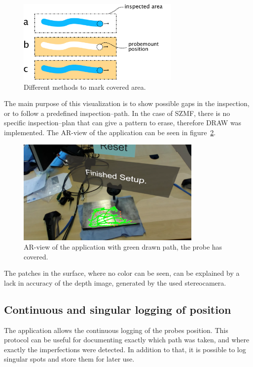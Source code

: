 \documentclass{VRARWorkshop}
\begin{document}
\begin{figure}[h!]
    \begin{center}
        \includegraphics[width=79mm]{images/DrawVsErase}
        \caption{\label{fig:DrawVsErase} Different methods to mark covered area.}
    \end{center}
\end{figure}

The main purpose of this visualization is to show possible gaps in the inspection, or to follow a predefined inspection--path.
In the case of SZMF, there is no specific inspection--plan that can give a pattern to erase, therefore DRAW was implemented.
The AR-view of the application can be seen in figure~\ref{fig:ARView}.

\begin{figure}[h!]
    \begin{center}
        \includegraphics[width=90mm]{images/AR-Screenshot}
        \caption{\label{fig:ARView} AR-view of the application with green drawn path, the probe has covered.}
    \end{center}
\end{figure}

The patches in the surface, where no color can be seen, can be explained by a lack in accuracy of the depth image, generated by the used stereocamera.

\subsection{Continuous and singular logging of position}
The application allows the continuous logging of the probes position.
This protocol can be useful for documenting exactly which path was taken, and where exactly the imperfections were detected.
In addition to that, it is possible to log singular spots and store them for later use.
\end{document}
